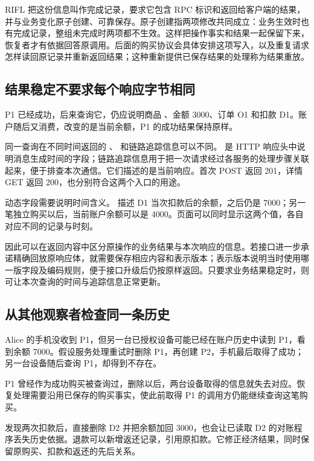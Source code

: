 RIFL 把这份信息叫作完成记录，要求它包含 RPC 标识和返回给客户端的结果，并与业务变化原子创建、可靠保存\cite{rifl}。原子创建指两项修改共同成立：业务生效时也有完成记录，整组未完成时两项都不生效。这样把操作事实和结果一起保留下来，恢复者才有依据回答原调用。后面的购买协议会具体安排这项写入，以及重复请求怎样读回原记录并重新返回结果；这种重新提供已保存结果的处理称为结果重放。

\subsection*{结果稳定不要求每个响应字节相同}

P1 已经成功，后来查询它，仍应说明商品 、金额 3000、订单 O1 和扣款 D1。账户随后又消费，改变的是当前余额，P1 的成功结果保持原样。

同一查询在不同时间返回的 、 和链路追踪信息可以不同。 是 HTTP 响应头中说明消息生成时间的字段；链路追踪信息用于把一次请求经过各服务的处理步骤关联起来，便于排查本次通信。它们描述的是当前响应。首次 POST 返回 201，详情 GET 返回 200，也分别符合这两个入口的用途。

动态字段需要说明时间含义。 描述 D1 当次扣款后的余额，之后仍是 7000；另一笔独立购买以后，当前账户余额可以是 4000。页面可以同时显示这两个值，各自对应不同的记录与时刻。



因此可以在返回内容中区分原操作的业务结果与本次响应的信息。若接口进一步承诺精确回放原响应体，就需要保存相应内容和表示版本；表示版本说明当时使用哪一版字段及编码规则，便于接口升级后仍按原样返回。只要求业务结果稳定时，则可让本次查询的时间与追踪信息正常更新。

\subsection*{从其他观察者检查同一条历史}

Alice 的手机没收到 P1，但另一台已授权设备可能已经在账户历史中读到 P1，看到余额 7000。假设服务处理重试时删除 P1，再创建 P2，手机最后取得了成功；另一台设备随后查询 P1，却得到不存在。

P1 曾经作为成功购买被查询过，删除以后，两台设备取得的信息就失去对应。恢复处理需要沿用已保存的购买事实，使此前取得 P1 的调用方仍能继续查询这笔购买。



发现两次扣款后，直接删除 D2 并把余额加回 3000，也会让已读取 D2 的对账程序丢失历史依据。退款可以新增返还记录，引用原扣款。它修正经济结果，同时保留原购买、扣款和返还的先后关系。

